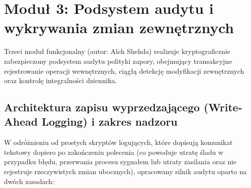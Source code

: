 \section{Moduł 3: Podsystem audytu i wykrywania zmian zewnętrznych}\label{sec:modul-logowanie}

Trzeci moduł funkcjonalny (autor: Aleh Shehda) realizuje kryptograficznie zabezpieczony podsystem audytu polityki zapory, obejmujący transakcyjne rejestrowanie operacji wewnętrznych, ciągłą detekcję modyfikacji zewnętrznych oraz kontrolę integralności dziennika.

\subsection{Architektura zapisu wyprzedzającego (Write-Ahead Logging) i zakres nadzoru}\label{subsec:rejestrowanie-operacji}

W odróżnieniu od prostych skryptów logujących, które dopisują komunikat tekstowy dopiero po zakończeniu polecenia (co powoduje utratę śladu w przypadku błędu, przerwania procesu sygnałem  lub utraty zasilania oraz nie rejestruje rzeczywistych zmian ubocznych), opracowany silnik audytu oparto na dwóch zasadach:

